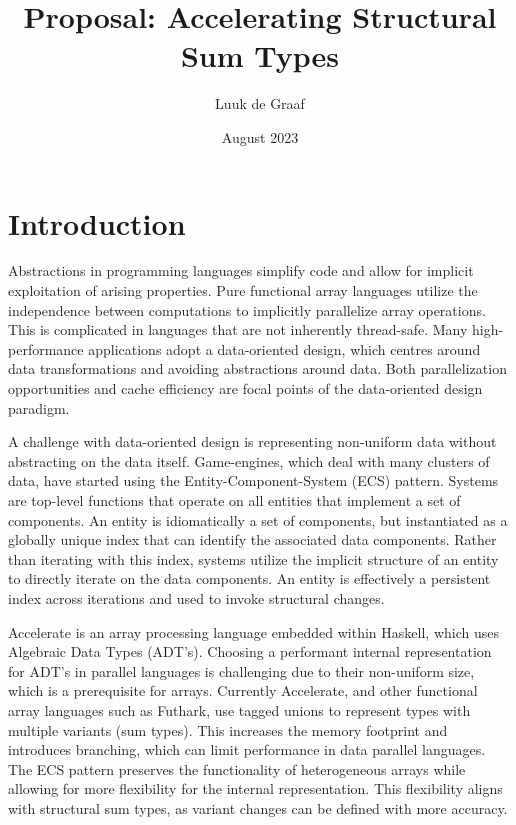 \documentclass{article}
\title{Proposal: Accelerating Structural Sum Types}
\author{Luuk de Graaf}
\date{August 2023}
\begin{document}
\maketitle

\tableofcontents

\newpage

\section{Introduction}

Abstractions in programming languages simplify code and allow for implicit exploitation of arising properties.
Pure functional array languages utilize the independence between computations to implicitly parallelize array operations.
This is complicated in languages that are not inherently thread-safe.
Many high-performance applications adopt a data-oriented design, which centres around data transformations and avoiding abstractions around data. 
Both parallelization opportunities and cache efficiency are focal points of the data-oriented design paradigm.

A challenge with data-oriented design is representing non-uniform data without abstracting on the data itself.
Game-engines, which deal with many clusters of data, have started using the Entity-Component-System (ECS) pattern. 
Systems are top-level functions that operate on all entities that implement a set of components. 
An entity is idiomatically a set of components, but instantiated as a globally unique index that can identify the associated data components.
Rather than iterating with this index, systems utilize the implicit structure of an entity to directly iterate on the data components.
An entity is effectively a persistent index across iterations and used to invoke structural changes.

Accelerate is an array processing language embedded within Haskell, which uses Algebraic Data Types (ADT's).
Choosing a performant internal representation for ADT's in parallel languages is challenging due to their non-uniform size, which is a prerequisite for arrays.
Currently Accelerate\cite{accelerate-sum-types}, and other functional array languages such as Futhark\cite{futhark-sum-types}, use tagged unions to represent types with multiple variants (sum types). 
This increases the memory footprint and introduces branching, which can limit performance in data parallel languages.   
The ECS pattern preserves the functionality of heterogeneous arrays while allowing for more flexibility for the internal representation.
This flexibility aligns with structural sum types, as variant changes can be defined with more accuracy. 
\end{document}
